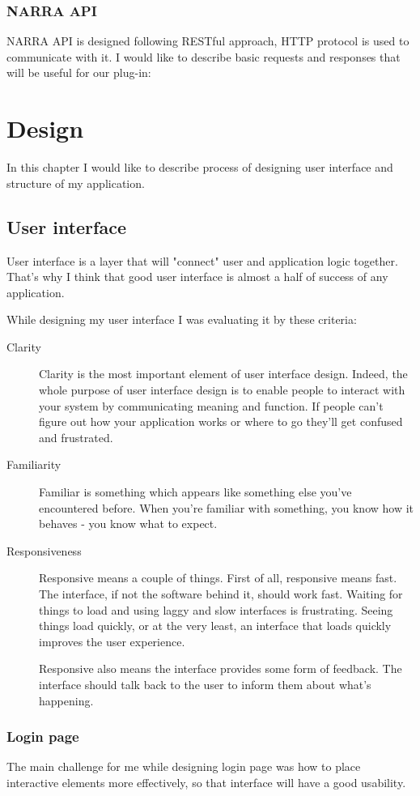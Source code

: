 \documentclass[thesis=B,english]{FITthesis}[2012/10/20]
\begin{document}
\subsection{NARRA API}
NARRA API is designed following RESTful approach, HTTP protocol is used to communicate with it. I would like to describe basic requests and responses that will be useful for our plug-in:
	
\chapter{Design}
In this chapter I would like to describe process of designing user interface and structure of my application.
\section{User interface}
User interface is a layer that will "connect" user and application logic together. That's why I think that good user interface is almost a half of success of any application. 

While designing my user interface I was evaluating it by these criteria:
	\begin{description}
		\item [Clarity] Clarity is the most important element of user interface design. Indeed, the whole purpose of user interface design is to enable people to interact with your system by communicating meaning and function. If people can’t figure out how your application works or where to go they’ll get confused and frustrated. \cite{ui}
		\item [Familiarity] Familiar is something which appears like something else you’ve encountered before. When you’re familiar with something, you know how it behaves - you know what to expect.
		\item [Responsiveness] Responsive means a couple of things. First of all, responsive means fast. The interface, if not the software behind it, should work fast. Waiting for things to load and using laggy and slow interfaces is frustrating. Seeing things load quickly, or at the very least, an interface that loads quickly improves the user experience.

Responsive also means the interface provides some form of feedback. The interface should talk back to the user to inform them about what’s happening. \cite{ui}
	\end{description}
\subsection{Login page}
The main challenge for me while designing login page was how to place interactive elements more effectively, so that interface will have a good usability.
\end{document}
